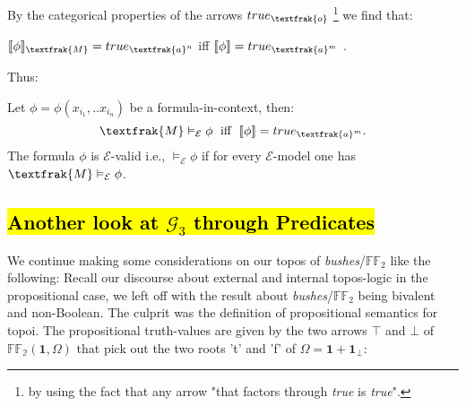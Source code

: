 By the categorical properties of the arrows $true_\textfrak{o}$ \footnote{by using the fact that any arrow "that factors through \emph{true} is \emph{true}".} we find that:

\begin{remark}
	$\llbracket \phi \rrbracket_\textfrak{M} = true_{\textfrak{a}^n}$ iff $\llbracket \phi \rrbracket = true_{\textfrak{a}^m}$ .
\end{remark}
Thus:
\begin{definition} Let $\phi = \phi(x_{i_1},..x_{i_n})$ be a formula-in-context,	then: 
	\begin{equation*}
		\textfrak{M} \vDash_\mathcal{E} \phi \;\text{	iff	}\; \llbracket \phi \rrbracket = true_{\textfrak{a}^m} .
	\end{equation*}
	The formula $\phi$ is $\mathcal{E}$-valid i.e., $ \vDash_\mathcal{E} \phi $ if for every $\mathcal{E}$-model  one has $ \textfrak{M}\vDash_\mathcal{E} \phi $.
\end{definition}



\subsection{\hl{Another look at $\mathcal{G}_3$ through Predicates}}
\label{anotherlook}

We continue making some considerations on our topos of \emph{bushes}/$\mathbb{FF}_2$ like the following:
\newline
Recall our discourse about external and internal topos-logic in the propositional case, we left off with the result about \emph{bushes}/$\mathbb{FF}_2$ being bivalent and non-Boolean.
\newline
The culprit was the definition of propositional semantics for topoi.
\newline
The propositional truth-values are given by the two arrows $\top$ and $\bot$ of $\mathbb{FF_2}(\textbf{1},\Omega)$ that pick out the two roots 't' and 'f' of $\Omega= \textbf{1} + \textbf{1}_\bot$: 


